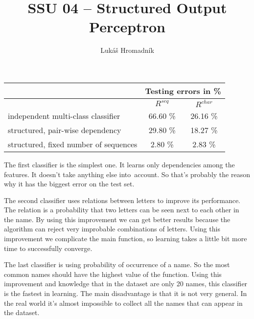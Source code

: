 \documentclass[12pt]{article}
\begin{document}
\title{SSU 04 – Structured Output Perceptron}
\author{Lukáš Hromadník}
\date{}

\pagestyle{empty}
\maketitle
\thispagestyle{empty}

\pagestyle{plain}

\begin{center}
    \begin{tabular}{|l|c|c|} \hline
    & \multicolumn{2}{c|}{Testing errors in \%} \\ \hline
    & $R^{seq}$ & $R^{char}$ \\ \hline
    independent multi-class classifier & 66.60 \% & 26.16 \% \\ \hline
    structured, pair-wise dependency & 29.80 \% & 18.27 \% \\ \hline
    structured, fixed number of sequences & 2.80 \% & 2.83 \% \\ \hline
    \end{tabular}
\end{center}

The first classifier is the simplest one. It learns only dependencies among the features. It doesn't take anything else into account. So that's probably the reason why it has the biggest error on the test set.

The second classifier uses relations between letters to improve its performance. The relation is a probability that two letters can be seen next to each other in the name. By using this improvement we can get better results because the algorithm can reject very improbable combinations of letters. Using this improvement we complicate the main function, so learning takes a little bit more time to successfully converge.

The last classifier is using probability of occurrence of a name. So the most common names should have the highest value of the function. Using this improvement and knowledge that in the dataset are only 20 names, this classifier is the fastest in learning. The main disadvantage is that it is not very general. In the real world it's almost impossible to collect all the names that can appear in the dataset.

\end{document}
